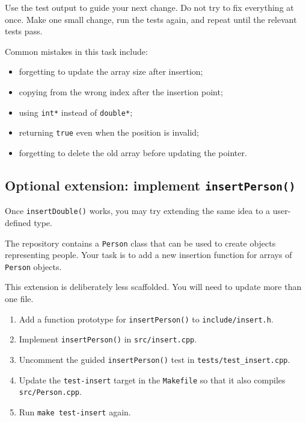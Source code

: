 \documentclass{csc2059practical}
\begin{document}
Use the test output to guide your next change. Do not try to fix everything at once. Make one small change, run the tests again, and repeat until the relevant tests pass.

\begin{commonerror}
Common mistakes in this task include:

\begin{itemize}
    \item forgetting to update the array size after insertion;
    \item copying from the wrong index after the insertion point;
    \item using \texttt{int*} instead of \texttt{double*};
    \item returning \texttt{true} even when the position is invalid;
    \item forgetting to delete the old array before updating the pointer.
\end{itemize}
\end{commonerror}

\subsection{Optional extension: implement \texttt{insertPerson()}}

Once \texttt{insertDouble()} works, you may try extending the same idea to a user-defined type.

The repository contains a \texttt{Person} class that can be used to create objects representing people. Your task is to add a new insertion function for arrays of \texttt{Person} objects.

This extension is deliberately less scaffolded. You will need to update more than one file.

\begin{enumerate}
    \item Add a function prototype for \texttt{insertPerson()} to \texttt{include/insert.h}.
    \item Implement \texttt{insertPerson()} in \texttt{src/insert.cpp}.
    \item Uncomment the guided \texttt{insertPerson()} test in \texttt{tests/test\_insert.cpp}.
    \item Update the \texttt{test-insert} target in the \texttt{Makefile} so that it also compiles \texttt{src/Person.cpp}.
    \item Run \texttt{make test-insert} again.
\end{enumerate}
\end{document}
